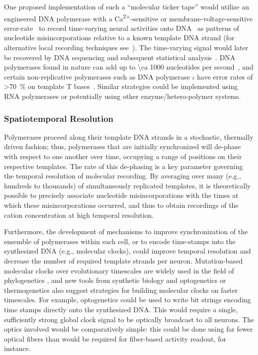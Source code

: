 One proposed implementation of such a ``molecular ticker tape'' would utilize an engineered DNA polymerase with a Ca\textsuperscript{2$+$}-sensitive or membrane-voltage-sensitive error-rate~\cite{zamft12} to record time-varying neural activities onto DNA~\cite{glaser13} as patterns of nucleotide misincorporations relative to a known template DNA strand (for alternative local recording techniques see~\cite{friedland09,bonnet13}).
The time-varying signal would later be recovered by DNA sequencing and subsequent statistical analysis~\cite{glaser13}.
DNA polymerases found in nature can add up to \num{\ca 1000} nucleotides per second~\cite{kelman95}, and certain non-replicative polymerases such as DNA polymerase $\iota$ have error rates of \SI{>70}{\percent} on template T bases~\cite{frank07}.
Similar strategies could be implemented using RNA polymerases or potentially using other enzyme/hetero-polymer systems.

\subsubsection{Spatiotemporal Resolution}

Polymerases proceed along their template DNA strands in a stochastic, thermally driven fashion; thus, polymerases that are initially synchronized will de-phase with respect to one another over time, occupying a range of positions on their respective templates. The rate of this de-phasing is a key parameter governing the temporal resolution of molecular recording. By averaging over many (e.g., hundreds to thousands) of simultaneously replicated templates, it is theoretically possible to precisely associate nucleotide misincorporations with the times at which these misincorporations occurred, and thus to obtain recordings of the cation concentration at high temporal resolution. 

Furthermore, the development of mechanisms to improve synchronization of the ensemble of polymerases within each cell, or to encode time-stamps into the synthesized DNA (e.g., molecular clocks), could improve temporal resolution and decrease the number of required template strands per neuron. Mutation-based molecular clocks over evolutionary timescales are widely used in the field of phylogenetics \cite{Ochman1987}, and new tools from synthetic biology \cite{Elowitz2000} and optogenetics or thermogenetics \cite{Bernstein2012} also suggest strategies for building molecular clocks on faster timescales. For example, optogenetics could be used to write bit strings encoding time stamps directly onto the synthesized DNA. This would require a single, sufficiently strong global clock signal to be optically broadcast to all neurons. The optics involved would be comparatively simple: this could be done using far fewer optical fibers than would be required for fiber-based activity readout, for instance.

